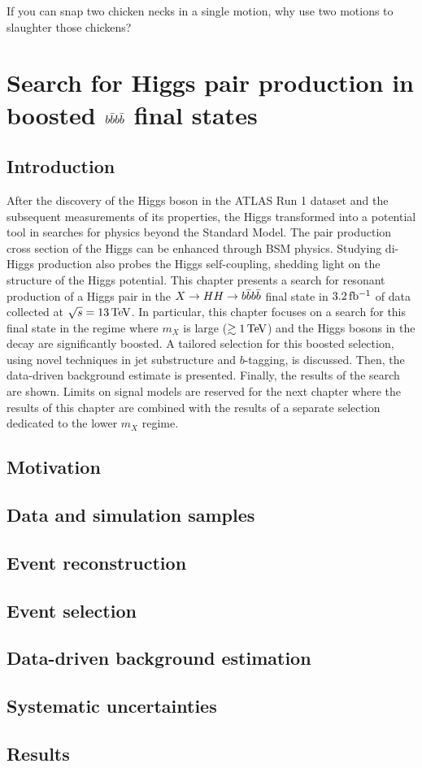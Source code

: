 \begin{savequote}[75mm]
If you can snap two chicken necks in a single motion, why use two motions to slaughter those chickens?
\end{savequote}

\chapter{Search for Higgs pair production in boosted $b\bar{b}b\bar{b}$ final states}
\label{chap:hwwstrategy}

\section{Introduction}

After the discovery of the Higgs boson in the ATLAS Run 1 dataset and the subsequent measurements of its properties, the Higgs transformed into a potential tool in searches for physics beyond the Standard Model. The pair production cross section of the Higgs can be enhanced through BSM physics. Studying di-Higgs production also probes the Higgs self-coupling, shedding light on the structure of the Higgs potential. This chapter presents a search for resonant production of a Higgs pair in the $X\to HH \to b\bar{b}b\bar{b}$ final state in $3.2 \mbox{\,fb$^{-1}$}$ of data collected at $\sqrt{s} = 13 \TeV$. In particular, this chapter focuses on a search for this final state in the regime where $m_{X}$ is large ($\gtrsim 1 \TeV$) and the Higgs bosons in the decay are significantly boosted. A tailored selection for this boosted selection, using novel techniques in jet substructure and $b$-tagging, is discussed. Then, the data-driven background estimate is presented. Finally, the results of the search are shown. Limits on signal models are reserved for the next chapter where the results of this chapter are combined with the results of a separate selection dedicated to the lower $m_X$ regime. 

\section{Motivation}

\section{Data and simulation samples}

\section{Event reconstruction}

\section{Event selection}

\section{Data-driven background estimation}

\section{Systematic uncertainties}

\section{Results}


